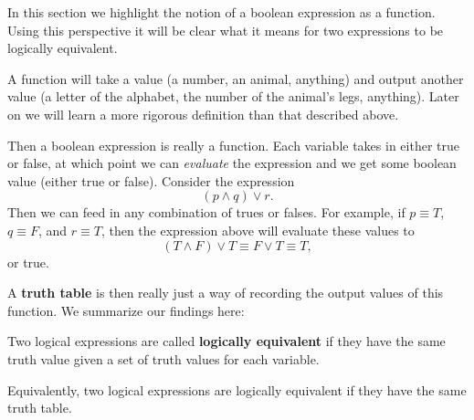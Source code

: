\newcommand{\andop}{\operatorname{AND}}
\newcommand{\orop}{\operatorname{OR}}
\newcommand{\notop}{\operatorname{NOT}}

In this section we highlight the notion of a boolean expression as a function. Using this perspective it will be clear what it means for two expressions to be logically equivalent. 

\begin{tcolorbox}
A function will take a value (a number, an animal, anything) and output another value (a letter of the alphabet, the number of the animal's legs, anything). Later on we will learn a more rigorous definition than that described above.
\end{tcolorbox}

Then a boolean expression is really a function. Each variable takes in either true or false, at which point we can \textit{evaluate} the expression and we get some boolean value (either true or false). Consider the expression
\[(p \land q) \lor r.\]
Then we can feed in any combination of trues or falses. For example, if $p \equiv T$, $q \equiv F$, and $r \equiv T$, then the expression above will evaluate these values to 
\[(T \land F) \lor T \equiv F \lor T \equiv T,\] or true.

A \textbf{truth table} is then really just a way of recording the output values of this function. We summarize our findings here:
\begin{tcolorbox}
Two logical expressions are called \textbf{logically equivalent} if they have the same truth value given a set of truth values for each variable.

Equivalently, two logical expressions are logically equivalent if they have the same truth table.
\end{tcolorbox}

